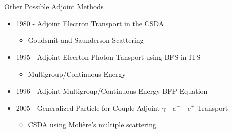 \documentclass{beamer}
\begin{document}
\begin{frame}{Other Possible Adjoint Methods}

     \begin{itemize}
       \item 1980 - Adjoint Electron Transport in the CSDA
           \begin{itemize}
             \item Goudsmit and Saunderson Scattering
           \end{itemize}
                 
       \item 1995 - Adjoint Elecrton-Photon Tansport using BFS in ITS
           \begin{itemize}
             \item Multigroup/Continuous Energy
           \end{itemize}
           
       \item 1996 - Adjoint Multigroup/Continuous Energy BFP Equation

      \item 2005 - Generalized Particle for Couple Adjoint $\gamma$ - $e^-$ - $e^+$ Transport
           \begin{itemize}
             \item CSDA using Moli\`{e}re's multiple scattering
           \end{itemize}
       
     \end{itemize}



\end{frame}
\end{document}
